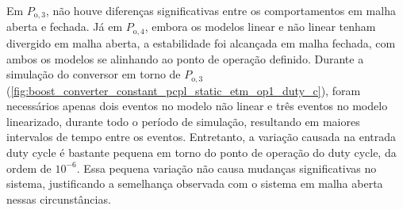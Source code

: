 Em $P_{\mathrm{o}, 3}$, não houve diferenças significativas entre os comportamentos em malha aberta e fechada. Já em $P_{\mathrm{o}, 4}$, embora os modelos linear e não linear tenham divergido em malha aberta, a estabilidade foi alcançada em malha fechada, com ambos os modelos se alinhando ao ponto de operação definido. Durante a simulação do conversor em torno de $P_{\mathrm{o}, 3}$ (\autoref{fig:boost_converter_constant_pcpl_static_etm_op1_duty_c}), foram necessários apenas dois eventos no modelo não linear e três eventos no modelo linearizado, durante todo o período de simulação, resultando em maiores intervalos de tempo entre os eventos. Entretanto, a variação causada na entrada duty cycle é bastante pequena em torno do ponto de operação do duty cycle, da ordem de $10^{-6}$. Essa pequena variação não causa mudanças significativas no sistema, justificando a semelhança observada com o sistema em malha aberta nessas circunstâncias.

